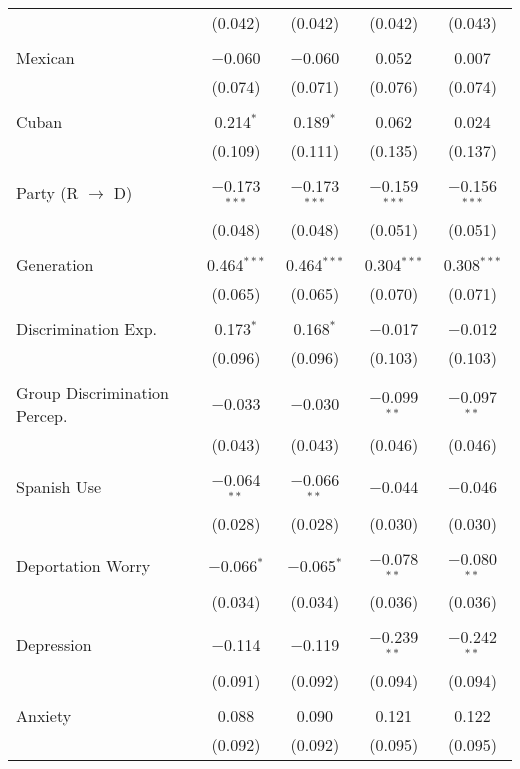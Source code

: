 \begin{table}[!htbp]
\begin{tabular}{@{\extracolsep{5pt}}lcccc}
  & (0.042) & (0.042) & (0.042) & (0.043) \\ 
  & & & & \\ 
 Mexican & $-$0.060 & $-$0.060 & 0.052 & 0.007 \\ 
  & (0.074) & (0.071) & (0.076) & (0.074) \\ 
  & & & & \\ 
 Cuban & 0.214$^{*}$ & 0.189$^{*}$ & 0.062 & 0.024 \\ 
  & (0.109) & (0.111) & (0.135) & (0.137) \\ 
  & & & & \\ 
 Party (R $\longrightarrow$ D) & $-$0.173$^{***}$ & $-$0.173$^{***}$ & $-$0.159$^{***}$ & $-$0.156$^{***}$ \\ 
  & (0.048) & (0.048) & (0.051) & (0.051) \\ 
  & & & & \\ 
 Generation & 0.464$^{***}$ & 0.464$^{***}$ & 0.304$^{***}$ & 0.308$^{***}$ \\ 
  & (0.065) & (0.065) & (0.070) & (0.071) \\ 
  & & & & \\ 
 Discrimination Exp. & 0.173$^{*}$ & 0.168$^{*}$ & $-$0.017 & $-$0.012 \\ 
  & (0.096) & (0.096) & (0.103) & (0.103) \\ 
  & & & & \\ 
 Group Discrimination Percep. & $-$0.033 & $-$0.030 & $-$0.099$^{**}$ & $-$0.097$^{**}$ \\ 
  & (0.043) & (0.043) & (0.046) & (0.046) \\ 
  & & & & \\ 
 Spanish Use & $-$0.064$^{**}$ & $-$0.066$^{**}$ & $-$0.044 & $-$0.046 \\ 
  & (0.028) & (0.028) & (0.030) & (0.030) \\ 
  & & & & \\ 
 Deportation Worry & $-$0.066$^{*}$ & $-$0.065$^{*}$ & $-$0.078$^{**}$ & $-$0.080$^{**}$ \\ 
  & (0.034) & (0.034) & (0.036) & (0.036) \\ 
  & & & & \\ 
 Depression & $-$0.114 & $-$0.119 & $-$0.239$^{**}$ & $-$0.242$^{**}$ \\ 
  & (0.091) & (0.092) & (0.094) & (0.094) \\ 
  & & & & \\ 
 Anxiety & 0.088 & 0.090 & 0.121 & 0.122 \\ 
  & (0.092) & (0.092) & (0.095) & (0.095) \\ 

\end{tabular}
\end{table}
